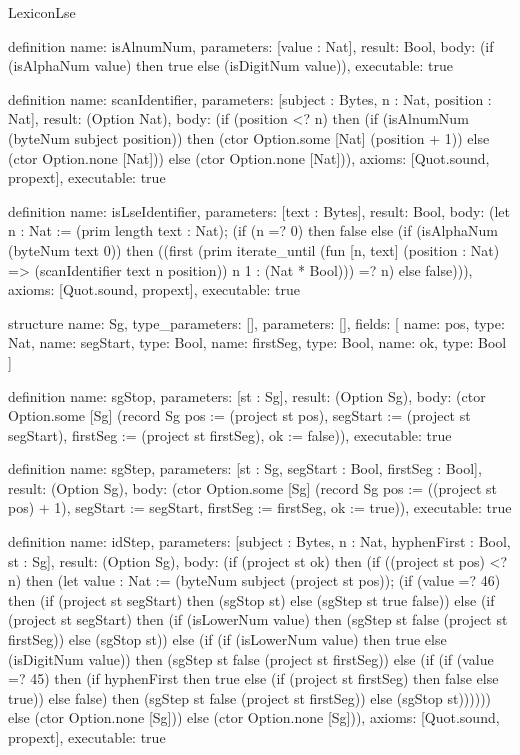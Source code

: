 \begin{lexlean}{LexiconLse}
\begin{semanticmodule}
definition{
  name: isAlnumNum,
  parameters: [value : Nat],
  result: Bool,
  body: (if (isAlphaNum value) then true else (isDigitNum value)),
  executable: true
}

definition{
  name: scanIdentifier,
  parameters: [subject : Bytes, n : Nat, position : Nat],
  result: (Option Nat),
  body: (if (position <? n) then (if (isAlnumNum (byteNum subject position)) then (ctor Option.some [Nat] (position + 1)) else (ctor Option.none [Nat])) else (ctor Option.none [Nat])),
  axioms: [Quot.sound, propext],
  executable: true
}

definition{
  name: isLseIdentifier,
  parameters: [text : Bytes],
  result: Bool,
  body: (let n : Nat := (prim length text : Nat); (if (n =? 0) then false else (if (isAlphaNum (byteNum text 0)) then ((first (prim iterate_until (fun [n, text] (position : Nat) => (scanIdentifier text n position)) n 1 : (Nat * Bool))) =? n) else false))),
  axioms: [Quot.sound, propext],
  executable: true
}

structure{
  name: Sg,
  type_parameters: [],
  parameters: [],
  fields: [
    {name: pos, type: Nat},
    {name: segStart, type: Bool},
    {name: firstSeg, type: Bool},
    {name: ok, type: Bool}
  ]
}

definition{
  name: sgStop,
  parameters: [st : Sg],
  result: (Option Sg),
  body: (ctor Option.some [Sg] (record Sg {pos := (project st pos), segStart := (project st segStart), firstSeg := (project st firstSeg), ok := false})),
  executable: true
}

definition{
  name: sgStep,
  parameters: [st : Sg, segStart : Bool, firstSeg : Bool],
  result: (Option Sg),
  body: (ctor Option.some [Sg] (record Sg {pos := ((project st pos) + 1), segStart := segStart, firstSeg := firstSeg, ok := true})),
  executable: true
}

definition{
  name: idStep,
  parameters: [subject : Bytes, n : Nat, hyphenFirst : Bool, st : Sg],
  result: (Option Sg),
  body: (if (project st ok) then (if ((project st pos) <? n) then (let value : Nat := (byteNum subject (project st pos)); (if (value =? 46) then (if (project st segStart) then (sgStop st) else (sgStep st true false)) else (if (project st segStart) then (if (isLowerNum value) then (sgStep st false (project st firstSeg)) else (sgStop st)) else (if (if (isLowerNum value) then true else (isDigitNum value)) then (sgStep st false (project st firstSeg)) else (if (if (value =? 45) then (if hyphenFirst then true else (if (project st firstSeg) then false else true)) else false) then (sgStep st false (project st firstSeg)) else (sgStop st)))))) else (ctor Option.none [Sg])) else (ctor Option.none [Sg])),
  axioms: [Quot.sound, propext],
  executable: true
}


\end{semanticmodule}
\end{lexlean}
